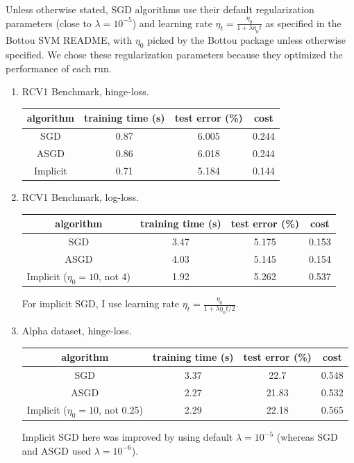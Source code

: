 \documentclass{article}
\begin{document}
\begin{enumerate}[(a)]
Unless otherwise stated, SGD algorithms use their default regularization parameters (close to $\lambda = 10^{-5}$) and learning rate $\eta_t = \frac{\eta_0}{1+ \lambda\eta_0 t}$ as specified in the Bottou SVM README, with $\eta_0$ picked by the Bottou package unless otherwise specified. We chose these regularization parameters because they optimized the performance of each run.

\begin{enumerate}[1.]
\item RCV1 Benchmark, hinge-loss.
\begin{center}
\begin{tabular}{ c | c | c | c }
  algorithm & training time (s) & test error (\%) & cost \\ \hline                       
  SGD & 0.87 &  6.005 & 0.244\\
  ASGD & 0.86 & 6.018 & 0.244\\
  Implicit & 0.71 & 5.184 & 0.144\\
\end{tabular}
\end{center}

\item RCV1 Benchmark, log-loss.
\begin{center}
\begin{tabular}{ c | c | c | c }
  algorithm & training time (s) & test error (\%) & cost \\ \hline                       
  SGD & 3.47 &  5.175 & 0.153\\
  ASGD & 4.03 & 5.145 & 0.154\\
  Implicit ($\eta_0=10$, not 4) & 1.92 & 5.262 & 0.537\\
\end{tabular}
\end{center}
For implicit SGD, I use learning rate $\eta_t = \frac{\eta_0}{1+ \lambda\eta_0 t/2}$.

\item Alpha dataset, hinge-loss.
\begin{center}
\begin{tabular}{ c | c | c | c }
  algorithm & training time (s) & test error (\%) & cost \\ \hline                       
  SGD & 3.37 & 22.7 & 0.548\\
  ASGD & 2.27 & 21.83 & 0.532\\
  Implicit ($\eta_0=10$, not 0.25) & 2.29 & 22.18 & 0.565\\
\end{tabular}
\end{center}
Implicit SGD here was improved by using default $\lambda = 10^{-5}$ (whereas SGD and ASGD used $\lambda = 10^{-6}$).


\end{enumerate}
\end{enumerate}
\end{document}
